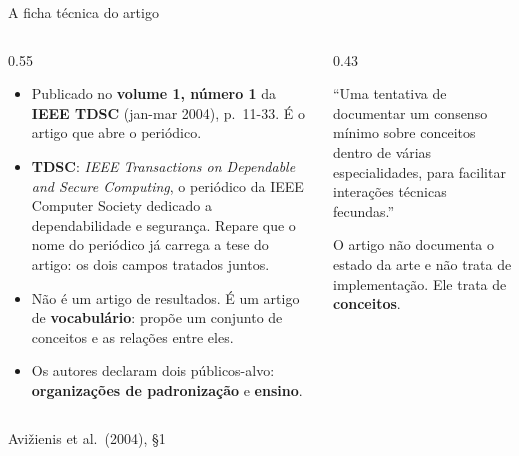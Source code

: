 \documentclass{beamer}
\newcommand{\sect}[1]{\par\smallskip\hfill{\tiny\color{black!55}Avi\v{z}ienis et al.\ (2004), #1}}
\begin{document}
\begin{frame}{A ficha t\'ecnica do artigo}
    \footnotesize
    \begin{columns}[T]
        \begin{column}{0.55\textwidth}
            \begin{itemize}
                \item Publicado no \textbf{volume 1, n\'umero 1} da \textbf{IEEE TDSC} (jan-mar 2004), p.\ 11-33. \'E o artigo que abre o peri\'odico.
                \item \textbf{TDSC}: \textit{IEEE Transactions on Dependable and Secure Computing}, o peri\'odico da IEEE Computer Society dedicado a dependabilidade e seguran\c{c}a. Repare que o nome do peri\'odico j\'a carrega a tese do artigo: os dois campos tratados juntos.
                \item N\~ao \'e um artigo de resultados. \'E um artigo de \textbf{vocabul\'ario}: prop\~oe um conjunto de conceitos e as rela\c{c}\~oes entre eles.
                \item Os autores declaram dois p\'ublicos-alvo: \textbf{organiza\c{c}\~oes de padroniza\c{c}\~ao} e \textbf{ensino}.
            \end{itemize}
        \end{column}
        \begin{column}{0.43\textwidth}
            \begin{defi}
                \scriptsize
                ``Uma tentativa de documentar um consenso m\'inimo sobre conceitos dentro de v\'arias especialidades, para facilitar intera\c{c}\~oes t\'ecnicas fecundas.''
            \end{defi}
            \smallskip
            \begin{armadilha}
                \scriptsize
                O artigo n\~ao documenta o estado da arte e n\~ao trata de implementa\c{c}\~ao. Ele trata de \textbf{conceitos}.
            \end{armadilha}
        \end{column}
    \end{columns}
    \sect{\S1}
\end{frame}
\end{document}

